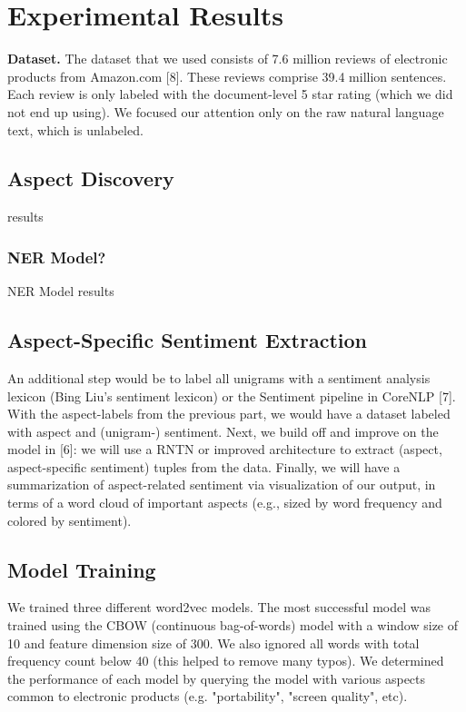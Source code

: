 \documentclass{article} %
\begin{document}
\section{Experimental Results} 

\textbf{Dataset.} The dataset that we used consists of 7.6 million reviews of electronic products from Amazon.com [8]. These reviews comprise 39.4 million sentences. Each review is only labeled with the document-level 5 star rating (which we did not end up using). We focused our attention only on the raw natural language text, which is unlabeled.



\subsection{Aspect Discovery}

results

\subsubsection{NER Model?}

NER Model results


\subsection{Aspect-Specific Sentiment Extraction}




An additional step would be to label all unigrams with a sentiment analysis lexicon (Bing Liu's sentiment lexicon) or the Sentiment pipeline in CoreNLP [7]. With the aspect-labels from the previous part, we would have a dataset labeled with aspect and (unigram-) sentiment. Next, we build off and improve on the model in [6]: we will use a RNTN or improved architecture to extract (aspect, aspect-specific sentiment) tuples from the data. Finally, we will have a summarization of aspect-related sentiment via visualization of our output, in terms of a word cloud of important aspects (e.g., sized by word frequency and colored by sentiment). 



\subsection{Model Training} We trained three different word2vec models. The most successful model was trained using the CBOW (continuous bag-of-words) model with a window size of 10 and feature dimension size of 300. We also ignored all words with total frequency count below 40 (this helped to remove many typos). We determined the performance of each model by querying the model with various aspects common to electronic products (e.g. "portability", "screen quality", etc).
\end{document}
